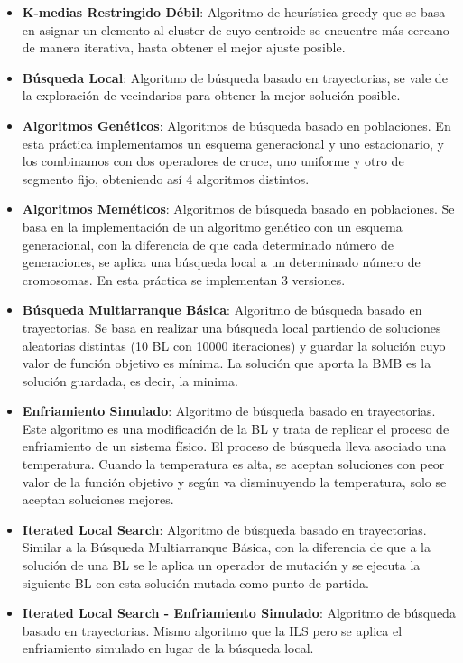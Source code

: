 \begin{itemize}
   \item \textbf{K-medias Restringido Débil}: Algoritmo de heurística greedy que se basa en asignar un elemento al cluster de cuyo centroide se encuentre más cercano de manera iterativa, hasta obtener el mejor ajuste posible.
   \item \textbf{Búsqueda Local}: Algoritmo de búsqueda basado en trayectorias, se vale de la exploración de vecindarios para obtener la mejor solución posible.
   \item \textbf{Algoritmos Genéticos}: Algoritmos de búsqueda basado en poblaciones. En esta práctica implementamos un esquema generacional y uno estacionario, y los combinamos con dos operadores de cruce, uno uniforme y otro de segmento fijo, obteniendo así 4 algoritmos distintos.
   \item \textbf{Algoritmos Meméticos}: Algoritmos de búsqueda basado en poblaciones. Se basa en la implementación de un algoritmo genético con un esquema generacional, con la diferencia de que cada determinado número de generaciones, se aplica una búsqueda local a un determinado número de cromosomas. En esta práctica se implementan 3 versiones. %
   \item \textbf{Búsqueda Multiarranque Básica}: Algoritmo de búsqueda basado en trayectorias. Se basa en realizar una búsqueda local partiendo de soluciones aleatorias distintas (10 BL con 10000 iteraciones) y guardar la solución cuyo valor de función objetivo es mínima. La solución que aporta la BMB es la solución guardada, es decir, la minima.
   \item \textbf{Enfriamiento Simulado}: Algoritmo de búsqueda basado en trayectorias. Este algoritmo es una modificación de la BL y trata de replicar el proceso de enfriamiento de un sistema físico. El proceso de búsqueda lleva asociado una temperatura. Cuando la temperatura es alta, se aceptan soluciones con peor valor de la función objetivo y según va disminuyendo la temperatura, solo se aceptan soluciones mejores.
   \item \textbf{Iterated Local Search}: Algoritmo de búsqueda basado en trayectorias. Similar a la Búsqueda Multiarranque Básica, con la diferencia de que a la solución de una BL se le aplica un operador de mutación y se ejecuta la siguiente BL con esta solución mutada como punto de partida.
   \item \textbf{Iterated Local Search - Enfriamiento Simulado}: Algoritmo de búsqueda basado en trayectorias. Mismo algoritmo que la ILS pero se aplica el enfriamiento simulado en lugar de la búsqueda local.

\end{itemize}
\newpage
